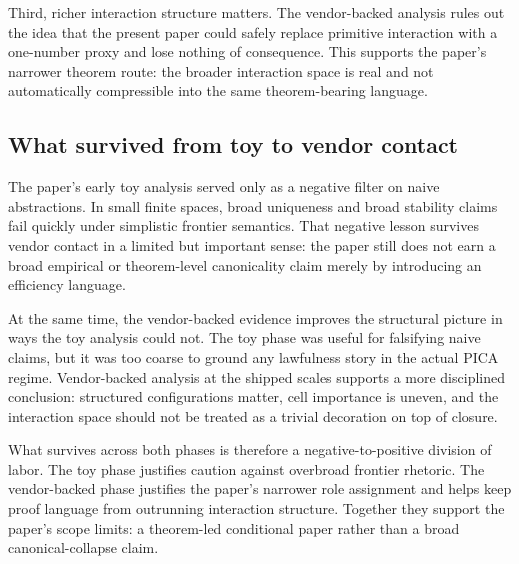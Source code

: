 \documentclass[11pt]{article}
\begin{document}
Third, richer interaction structure matters. The vendor-backed analysis rules
out the idea that the present paper could safely replace primitive interaction
with a one-number proxy and lose nothing of consequence. This supports the
paper's narrower theorem route: the broader interaction space is real and not
automatically compressible into the same theorem-bearing language.

\subsection*{What survived from toy to vendor contact}

The paper's early toy analysis served only as a negative filter on naive
abstractions. In small finite spaces, broad uniqueness and broad stability
claims fail quickly under simplistic frontier semantics. That negative lesson
survives vendor contact in a limited but important sense: the paper still does
not earn a broad empirical or theorem-level canonicality claim merely by
introducing an efficiency language.

At the same time, the vendor-backed evidence improves the structural picture in
ways the toy analysis could not. The toy phase was useful for falsifying naive
claims, but it was too coarse to ground any lawfulness story in the actual PICA
regime. Vendor-backed analysis at the shipped scales supports a more disciplined
conclusion: structured configurations matter, cell importance is uneven, and the
interaction space should not be treated as a trivial decoration on top of
closure.

What survives across both phases is therefore a negative-to-positive division of
labor. The toy phase justifies caution against overbroad frontier rhetoric. The
vendor-backed phase justifies the paper's narrower role assignment and helps
keep proof language from outrunning interaction structure. Together they
support the paper's scope limits: a theorem-led conditional paper rather than a
broad canonical-collapse claim.
\end{document}
